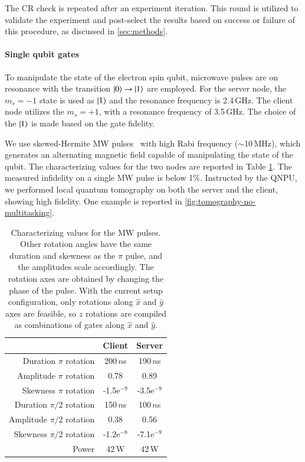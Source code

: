 The \ac{CR} check is repeated after an experiment iteration. This round is utilized to validate the experiment and post-select the results based on success or failure of this procedure, as discussed in \cref{sec:methods}.

\paragraph{Single qubit gates}

To manipulate the state of the electron spin qubit, microwave pulses are on resonance with the transition $\ket{0}\rightarrow\ket{1}$ are employed. For the server node, the $m_s=-1$ state is used as $\ket{1}$ and the resonance frequency is 2.4\,GHz. The client node utilizes the $m_s=+1$, with a resonance frequency of 3.5\,GHz. The choice of the $\ket{1}$ is made based on the gate fidelity.

We use skewed-Hermite \acf{MW} pulses~\cite{warren_1984,vandersypen_2005} with high Rabi frequency ($\sim$10\,MHz), which generates an alternating magnetic field capable of manipulating the state of the qubit. The characterizing values for the two nodes are reported in Table \ref{tab:mw_pulse}. The measured infidelity on a single \ac{MW} pulse is below 1\%. Instructed by the \ac{QNPU}, we performed local quantum tomography on both the server and the client, showing high fidelity. One example is reported in \cref{fig:tomography-no-multitasking}.

\begin{table}[]
    \centering
    \begin{tabular}{|r|c|c|}
    \hline
 &Client & Server\\
\hline
        Duration $\pi$ rotation & 200\,$n$s & 190\,$n$s\\
        Amplitude $\pi$ rotation & 0.78 & 0.89\\
        Skewness $\pi$ rotation & -1.5e$^{-9}$ & -3.5e$^{-9}$\\
        Duration $\pi/2$ rotation & 150\,$n$s&  100\,$n$s\\
        Amplitude $\pi/2$ rotation & 0.38 & 0.56\\
        Skewness $\pi/2$ rotation & -1.2e$^{-8}$& -7.1e$^{-9}$ \\
        Power & 42\,W & 42\,W\\
        \hline
    \end{tabular}
    \caption{Characterizing values for the \ac{MW} pulses. Other rotation angles have the same duration and skewness as the $\pi$ pulse, and the amplitudes scale accordingly. The rotation axes are obtained by changing the phase of the pulse. With the current setup configuration, only rotations along $\hat{x}$ and $\hat{y}$ axes are feasible, so $\hat{z}$ rotations are compiled as combinations of gates along $\hat{x}$ and $\hat{y}$.}
    \label{tab:mw_pulse}
\end{table}

